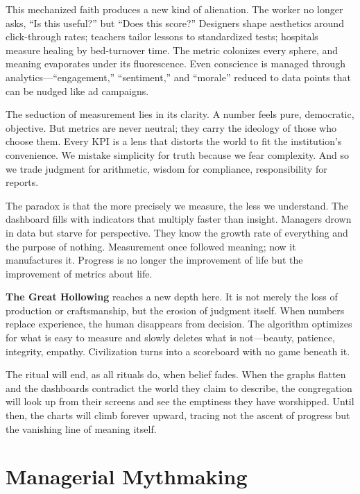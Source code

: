 \documentclass[11pt,twoside]{book}
\begin{document}
This mechanized faith produces a new kind of alienation.  The worker no longer asks, “Is this useful?” but “Does this score?”  Designers shape aesthetics around click-through rates; teachers tailor lessons to standardized tests; hospitals measure healing by bed-turnover time.  The metric colonizes every sphere, and meaning evaporates under its fluorescence.  Even conscience is managed through analytics—“engagement,” “sentiment,” and “morale” reduced to data points that can be nudged like ad campaigns.

The seduction of measurement lies in its clarity.  A number feels pure, democratic, objective.  But metrics are never neutral; they carry the ideology of those who choose them.  Every KPI is a lens that distorts the world to fit the institution’s convenience.  We mistake simplicity for truth because we fear complexity.  And so we trade judgment for arithmetic, wisdom for compliance, responsibility for reports.

The paradox is that the more precisely we measure, the less we understand.  The dashboard fills with indicators that multiply faster than insight.  Managers drown in data but starve for perspective.  They know the growth rate of everything and the purpose of nothing.  Measurement once followed meaning; now it manufactures it.  Progress is no longer the improvement of life but the improvement of metrics about life.

\textbf{The Great Hollowing} reaches a new depth here.  It is not merely the loss of production or craftsmanship, but the erosion of judgment itself.  When numbers replace experience, the human disappears from decision.  The algorithm optimizes for what is easy to measure and slowly deletes what is not—beauty, patience, integrity, empathy.  Civilization turns into a scoreboard with no game beneath it.

The ritual will end, as all rituals do, when belief fades.  When the graphs flatten and the dashboards contradict the world they claim to describe, the congregation will look up from their screens and see the emptiness they have worshipped.  Until then, the charts will climb forever upward, tracing not the ascent of progress but the vanishing line of meaning itself.

%
\chapter{Managerial Mythmaking}
\label{ch:04}
\end{document}
